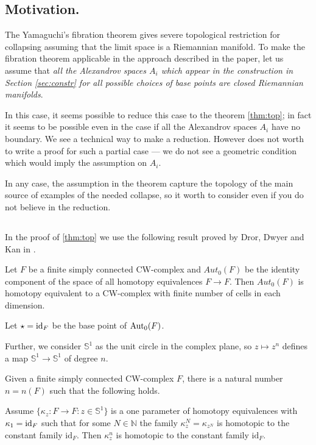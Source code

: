 \documentclass{amsart}
\begin{document}
\subsection{Motivation.} The Yamaguchi's fibration theorem gives severe topological restriction for collapsing assuming that the limit space is a Riemannian manifold.
To make the fibration theorem applicable in the approach described in the paper,
let us assume that \emph{all the Alexandrov spaces $A_i$ which appear in the construction in  Section \ref{sec:constr} for all possible choices of base points are closed Riemannian manifolds}.

In this case, it seems possible to reduce this case to the theorem \ref{thm:top};
in fact it seems to be possible even in the case if all the Alexandrov spaces $A_i$ have no boundary.
We see a technical way to make a reduction.
However does not worth to write a proof for such a partial case --- we do not see a  geometric condition which would imply the assumption on $A_i$.

In any case, the assumption in the theorem  capture the topology of the main source of examples of the needed collapse, so it worth to consider even if you do not believe in the reduction. 

\subsection{}
In the proof of \ref{thm:top} we use the following result proved by Dror,  Dwyer and Kan in \cite{DDK}.

\begin{thm}\label{thm:DDK}
Let $F$ be a finite simply connected CW-complex and 
$Aut_0(F)$ be the identity component  of the 
space of all homotopy equivalences $F\to F$. Then $Aut_0(F)$ is homotopy equivalent to a CW-complex with finite number of cells in each dimension.
\end{thm}

Let $\star=\operatorname{\rm id}_F$ be the base point of $\operatorname{\rm Aut}_0(F)$.

Further, we consider $\mathbb{S}^1$ as the unit circle in the complex plane, so  $z\mapsto z^n$ defines a map $\mathbb{S}^1\to \mathbb{S}^1$ of degree $n$.

\begin{cor}\label{cor:DDK}

Given a finite simply connected CW-complex $F$, there is a natural number $n=n(F)$ such that the following  holds.

Assume
$\{\kappa_z\colon F\to F: z\in \mathbb{S}^1\}$ is a one parameter of homotopy equivalences with $\kappa_1=\operatorname{\rm id}_F$
such that for some $N\in\mathbb{N}$ the family $\kappa^N_z=\kappa_{z^N}$ is homotopic to the constant family $\mathrm{id}_F$. 
Then $\kappa^n_z$ is homotopic to the constant family $\mathrm{id}_F$.

\end{cor}
\end{document}
